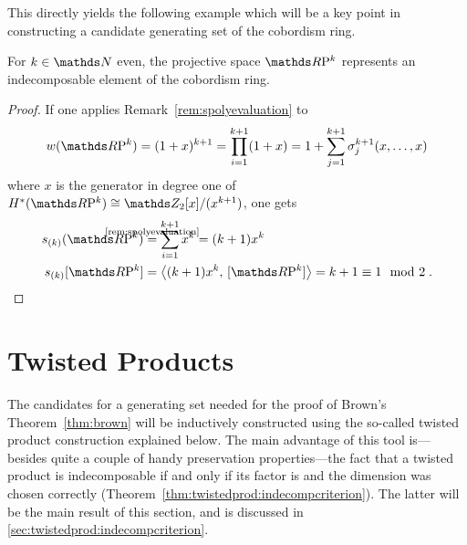 This directly yields the following example which will be a key point
in constructing a candidate generating set of the cobordism ring.
\begin{Ex}\label{ex:rpnindecomposable}
  For $k\in\Nat$ even, the projective space $\RP k$ represents an
  indecomposable element of the cobordism ring.
  \begin{proof}
    If one applies Remark~\ref{rem:spolyevaluation} to
    \begin{gather*}
      \W{\RP k}
      = (1+x)^{k+1}
      = \prod_{i=1}^{k+1}(1+x)
      = 1+\sum_{j=1}^{k+1} \el{j}{k+1}(x,\dotsc,x)
    \end{gather*}
    where $x$ is the
    generator in degree one of $\H^*(\RP k)\cong\Zmod2[x]/(x^{k+1})$,
    one gets
    \begin{align*}
      \s{(k)}(\RP k)
      &\cequalsby{\ref{rem:spolyevaluation}}
        \sum_{i=1}^{k+1} x^k
        = (k+1)x^k \\
      \snum{(k)}{\RP k}
      &= \capped{(k+1)x^k}{\fundcl{\RP k}}
        = k+1
        \equiv 1 \mod2
        \;.
        \qedhere
    \end{align*}
  \end{proof}
\end{Ex}

\section{Twisted Products}
\label{sec:twistedprod}
The candidates for a generating set needed for the proof of Brown's
Theorem~\ref{thm:brown} will be inductively constructed
using the so-called twisted product construction explained below.
The main advantage of this tool is---besides quite a couple of handy
preservation properties---the fact that a twisted product is
indecomposable if and only if its factor is and the dimension was
chosen correctly
(Theorem~\ref{thm:twistedprod:indecompcriterion}). The latter will
be the main result of this section, and is discussed in
\autoref{sec:twistedprod:indecompcriterion}.

